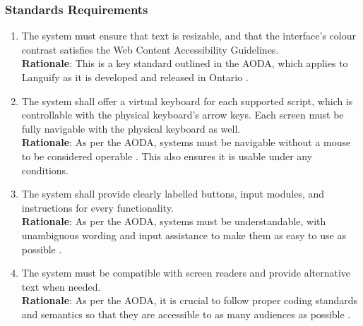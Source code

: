 \subsubsection{Standards Requirements}
\label{ssub:standards_requirements}
\begin{enumerate}[{LR-STD}1. ]
	\item The system must ensure that text is resizable, and that the interface’s colour contrast satisfies the Web Content Accessibility Guidelines.
	\\ \textbf{Rationale}: This is a key standard outlined in the AODA, which applies to Languify as it is developed and released in Ontario \cite{Speedtest2025}.
	\item The system shall offer a virtual keyboard for each supported script, which is controllable with the physical keyboard’s arrow keys. Each screen must be fully navigable with the physical keyboard as well.
	\\ \textbf{Rationale}: As per the AODA, systems must be navigable without a mouse to be considered operable \cite{Speedtest2025}. This also ensures it is usable under any conditions.
	\item The system shall provide clearly labelled buttons, input modules, and instructions for every functionality.
	\\ \textbf{Rationale}: As per the AODA, systems must be understandable, with unambiguous wording and input assistance to make them as easy to use as possible \cite{AODA2025}.
	\item The system must be compatible with screen readers and provide alternative text when needed.
	\\ \textbf{Rationale}: As per the AODA, it is crucial to follow proper coding standards and semantics so that they are accessible to as many audiences as possible \cite{AODA2025}.
\end{enumerate}


